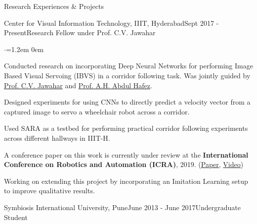 \documentclass{resume} %
\begin{document}
\begin{rSection}{Research Experiences \& Projects}
\begin{rSubsection}{Center for Visual Information Technology, IIIT, Hyderabad}{Sept 2017 - Present}{Research Fellow under Prof. C.V. Jawahar}{}
\vspace*{-0.2em}
\begin{list}{$\cdot$}{\leftmargin=1.2em}
\itemsep0em 
\item Conducted research on incorporating Deep Neural Networks for performing Image Based Visual Servoing (IBVS) in a corridor following task. Was jointly guided by \href{https://scholar.google.com/citations?user=U9dH-DoAAAAJ&hl=en}{Prof. C.V. Jawahar} and \href{https://scholar.google.com/citations?user=81UGxdYAAAAJ&hl=en}{Prof. A.H. Abdul Hafez}.
\item Designed experiments for using CNNs to directly predict a velocity vector from a captured image to servo a wheelchair robot across a corridor.
\item Used SARA as a testbed for performing practical corridor following experiments across different hallways in IIIT-H.
\item A conference paper on this work is currently under review at the \textbf{International Conference on Robotics and Automation (ICRA)}, 2019.
\hfill
(\href{https://vdorbala.github.io/pdf/ICRA_paper.pdf}{Paper}, \href{https://vdorbala.github.io/pdf/ICRA_video.mp4}{Video})
\item Working on extending this project by incorporating an Imitation Learning setup to improve qualitative results.
\end{list}
\hfill



\end{rSubsection}

\begin{rSubsection}{Symbiosis International University, Pune}{June 2013 - June 2017}{Undergraduate Student}{}
\item


\end{rSubsection}
\end{rSection}
\end{document}

